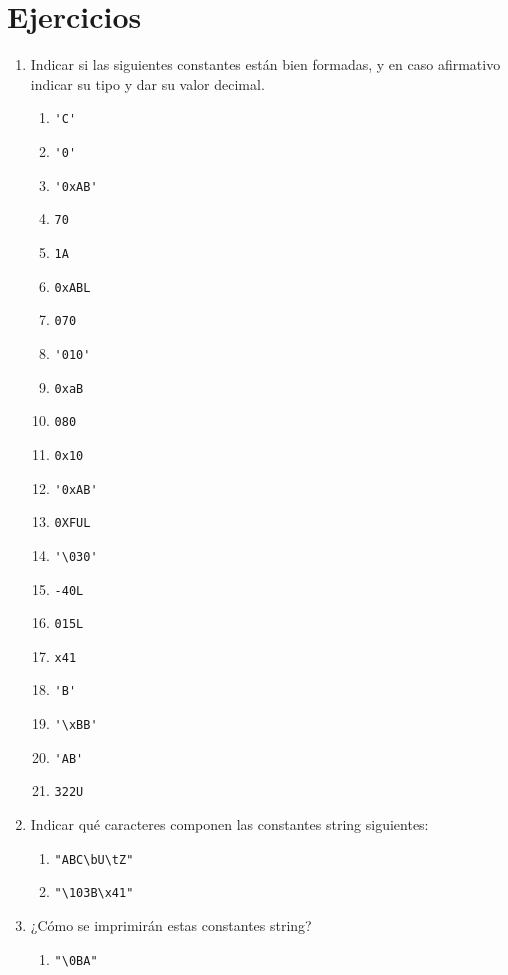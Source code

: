 
\section{Ejercicios}
\label{tc-constantes-ej}
\begin{enumerate}
	\item Indicar si las siguientes constantes están bien formadas, y en caso afirmativo indicar su tipo y dar su
valor decimal.
		\begin{multicols}{4}
		\begin{enumerate}[label=\alph*.]
\item \lstinline{'C'} 
\item \lstinline{'0'}
\item \lstinline{'0xAB'}
\item \lstinline{70}
\item \lstinline{1A}
\item \lstinline{0xABL}
\item \lstinline{070} 
\item \lstinline{'010'} 
\item \lstinline{0xaB}
\item \lstinline{080}
\item \lstinline{0x10} 
\item \lstinline{'0xAB'}
\item \lstinline{0XFUL}
\item \lstinline{'\030'} 
\item \lstinline{-40L}
\item \lstinline{015L}
\item \lstinline{x41}
\item \lstinline{'B'}
\item \lstinline{'\xBB'} 
\item \lstinline{'AB'}
\item \lstinline{322U}
	\end{enumerate}
	\end{multicols}
\item Indicar qué caracteres componen las constantes string siguientes:
		\begin{enumerate}[label=\alph*.]
\item \lstinline{"ABC\bU\tZ"}
\item \lstinline{"\103B\x41"}
	\end{enumerate}
\item ¿Cómo se imprimirán estas constantes string?
		\begin{enumerate}[label=\alph*.]
\item \lstinline{"\0BA"}

\end{enumerate}
\end{enumerate}
